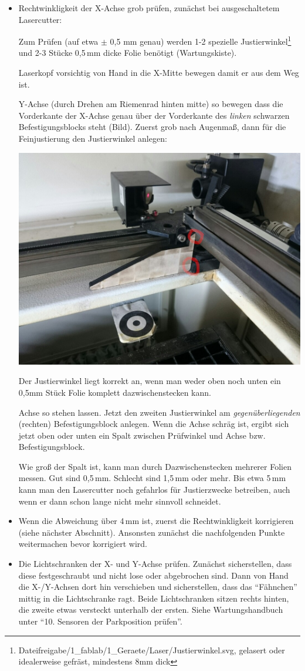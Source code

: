 \documentclass{\basedir/fablab-document}
\begin{document}
\begin{itemize}
		\item Rechtwinkligkeit der X-Achse grob prüfen, zunächst bei ausgeschaltetem Lasercutter:
		
		Zum Prüfen (auf etwa $\pm$ 0,5 mm genau) werden 1-2 spezielle Justierwinkel\footnote{Dateifreigabe/1\_fablab/1\_Geraete/Laser/Justierwinkel.svg, gelasert oder idealerweise gefräst, mindestens 8mm dick} und 2-3 Stücke 0,5\,mm dicke Folie benötigt (Wartungskiste).
		
		Laserkopf vorsichtig von Hand in die X-Mitte bewegen damit er aus dem Weg ist.
		
		Y-Achse (durch Drehen am Riemenrad hinten mitte) so bewegen dass die Vorderkante der X-Achse genau über der Vorderkante des \emph{linken} schwarzen Befestigungsblocks steht (Bild). Zuerst grob nach Augenmaß, dann für die Feinjustierung den Justierwinkel anlegen:
		
		\includegraphics[width=.5\linewidth]{img/laserjustierwinkel}
		
		Der Justierwinkel liegt korrekt an, wenn man weder oben noch unten ein 0,5mm Stück Folie komplett dazwischenstecken kann.
		
		Achse so stehen lassen. Jetzt den zweiten Justierwinkel am \emph{gegenüberliegenden} (rechten) Befestigungsblock anlegen. Wenn die Achse schräg ist, ergibt sich jetzt oben oder unten ein Spalt zwischen Prüfwinkel und Achse bzw. Befestigungsblock.
		
		Wie groß der Spalt ist, kann man durch Dazwischenstecken mehrerer Folien messen. Gut sind 0,5\,mm. Schlecht sind 1,5\,mm oder mehr. Bis etwa 5\,mm kann man den Lasercutter noch gefahrlos für Justierzwecke betreiben, auch wenn er dann schon lange nicht mehr sinnvoll schneidet.
		
		\item Wenn die Abweichung über 4\,mm ist, zuerst die Rechtwinkligkeit korrigieren (siehe nächster Abschnitt). Ansonsten zunächst die nachfolgenden Punkte weitermachen bevor korrigiert wird.
		
		\item Die Lichtschranken der X- und Y-Achse prüfen. Zunächst sicherstellen, dass diese festgeschraubt und nicht lose oder abgebrochen sind. Dann von Hand die X-/Y-Achsen dort hin verschieben und sicherstellen, dass das \enquote{Fähnchen} mittig in die Lichtschranke ragt. Beide Lichtschranken sitzen rechts hinten, die zweite etwas versteckt unterhalb der ersten. Siehe Wartungshandbuch unter \enquote{10. Sensoren der Parkposition prüfen}.
		

\end{itemize}
\end{document}
